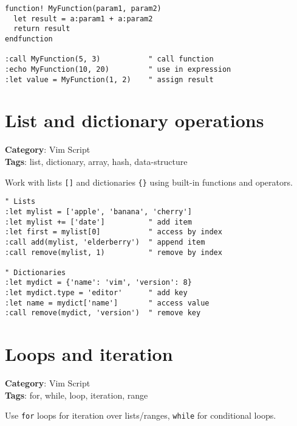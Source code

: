 {{{{{{{{{{{{{{{{{{{\begin{Exa*}{}
\begin{Verbatim}[fontsize=\footnotesize, breaklines, breakanywhere]
function! MyFunction(param1, param2)
  let result = a:param1 + a:param2
  return result
endfunction

:call MyFunction(5, 3)           " call function
:echo MyFunction(10, 20)         " use in expression
:let value = MyFunction(1, 2)    " assign result
\end{Verbatim}
\end{Exa*}

\section{List and dictionary operations}

\textbf{Category}: Vim Script\\ \textbf{Tags}: list, dictionary, array, hash, data-structure
\vspace{0.5cm}

Work with lists {\footnotesize \Verb§[]§} and dictionaries {\footnotesize \Verb§{}§} using built-in functions and operators.

\begin{Exa*}{}
\begin{Verbatim}[fontsize=\footnotesize, breaklines, breakanywhere]
" Lists
:let mylist = ['apple', 'banana', 'cherry']
:let mylist += ['date']          " add item
:let first = mylist[0]           " access by index
:call add(mylist, 'elderberry')  " append item
:call remove(mylist, 1)          " remove by index

" Dictionaries
:let mydict = {'name': 'vim', 'version': 8}
:let mydict.type = 'editor'      " add key
:let name = mydict['name']       " access value
:call remove(mydict, 'version')  " remove key
\end{Verbatim}
\end{Exa*}

\section{Loops and iteration}

\textbf{Category}: Vim Script\\ \textbf{Tags}: for, while, loop, iteration, range
\vspace{0.5cm}

Use {\footnotesize \Verb§for§} loops for iteration over lists/ranges, {\footnotesize \Verb§while§} for conditional loops.

}}}}}}}}}}}}}}}}}}}
